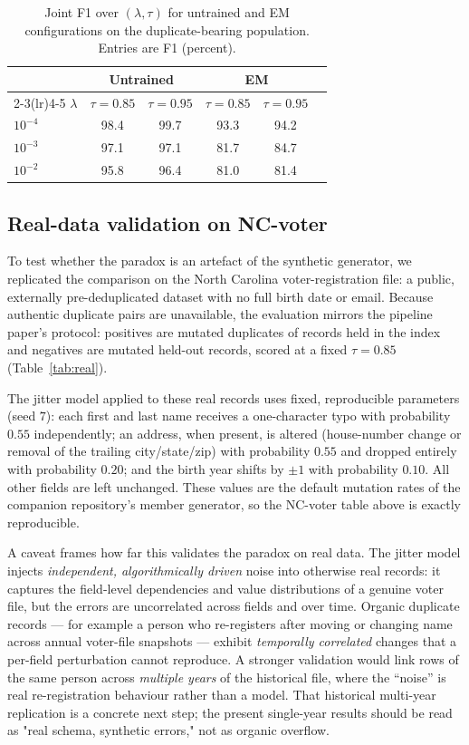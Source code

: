 \documentclass[conference]{IEEEtran}
\begin{document}
\begin{table}[t]
\centering
\caption{Joint F1 over $(\lambda,\tau)$ for untrained and EM configurations on the
duplicate-bearing population. Entries are F1 (percent).}
\label{tab:surface}
\begin{tabular}{lccccc}
\toprule
 & \multicolumn{2}{c}{Untrained} & \multicolumn{2}{c}{EM} & \\
\cmidrule(lr){2-3}\cmidrule(lr){4-5}
$\lambda$ & $\tau=0.85$ & $\tau=0.95$ & $\tau=0.85$ & $\tau=0.95$ &\\
\midrule
$10^{-4}$ & 98.4 & 99.7 & 93.3 & 94.2 &\\
$10^{-3}$ & 97.1 & 97.1 & 81.7 & 84.7 &\\
$10^{-2}$ & 95.8 & 96.4 & 81.0 & 81.4 &\\
\bottomrule
\end{tabular}
\end{table}

\subsection{Real-data validation on NC-voter}
\label{sec:real}
To test whether the paradox is an artefact of the synthetic generator, we replicated the
comparison on the North Carolina voter-registration file: a public, externally
pre-deduplicated dataset with no full birth date or email. Because authentic duplicate pairs
are unavailable, the evaluation mirrors the pipeline paper's protocol: positives are
mutated duplicates of records held in the index and negatives are mutated held-out records,
scored at a fixed $\tau=0.85$ (Table~\ref{tab:real}).

The jitter model applied to these real records uses fixed, reproducible parameters
(seed $7$): each first and last name receives a one-character typo with probability $0.55$
independently; an address, when present, is altered (house-number change or removal of the
trailing city/state/zip) with probability $0.55$ and dropped entirely with probability
$0.20$; and the birth year shifts by $\pm1$ with probability $0.10$. All other fields are
left unchanged. These values are the default mutation rates of the companion repository's
member generator, so the NC-voter table above is exactly reproducible.

A caveat frames how far this validates the paradox on real data. The jitter model injects
\emph{independent, algorithmically driven} noise into otherwise real records: it captures the
field-level dependencies and value distributions of a genuine voter file, but the errors are
uncorrelated across fields and over time. Organic duplicate records --- for example a person
who re-registers after moving or changing name across annual voter-file snapshots --- exhibit
\emph{temporally correlated} changes that a per-field perturbation cannot reproduce. A
stronger validation would link rows of the same person across \emph{multiple years} of the
historical file, where the ``noise'' is real re-registration behaviour rather than a model.
That historical multi-year replication is a concrete next step; the present single-year
results should be read as "real schema, synthetic errors," not as organic overflow.
\end{document}
